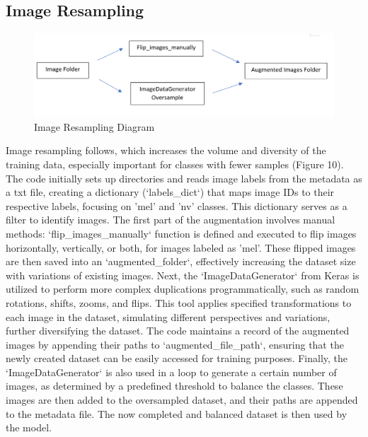 \documentclass[10pt,twocolumn]{article}
\begin{document}
\subsection{Image Resampling}
\begin{figure}[h]
\caption{Image Resampling Diagram}
\includegraphics[scale=0.35]{Augment Images.png}\newline
\end{figure}

Image resampling follows, which increases the volume and diversity of the training data, especially important for classes with fewer samples (Figure 10).
\newline
The code initially sets up directories and reads image labels from the metadata as a txt file, creating a dictionary (`labels\_dict`) that maps image IDs to their respective labels, focusing on 'mel' and 'nv' classes. This dictionary serves as a filter to identify images.
\newline
The first part of the augmentation involves manual methods: `flip\_images\_manually` function is defined and executed to flip images horizontally, vertically, or both, for images labeled as 'mel'. These flipped images are then saved into an `augmented\_folder`, effectively increasing the dataset size with variations of existing images.
\newline
Next, the `ImageDataGenerator` from Keras is utilized to perform more complex duplications programmatically, such as random rotations, shifts, zooms, and flips. This tool applies specified transformations to each image in the dataset, simulating different perspectives and variations, further diversifying the dataset.
\newline
The code maintains a record of the augmented images by appending their paths to `augmented\_file\_path`, ensuring that the newly created dataset can be easily accessed for training purposes.
\newline
Finally, the `ImageDataGenerator` is also used in a loop to generate a certain number of images, as determined by a predefined threshold to balance the classes. These images are then added to the oversampled dataset, and their paths are appended to the metadata file.
\newline
The now completed and balanced dataset is then used by the model. 
\end{document}
